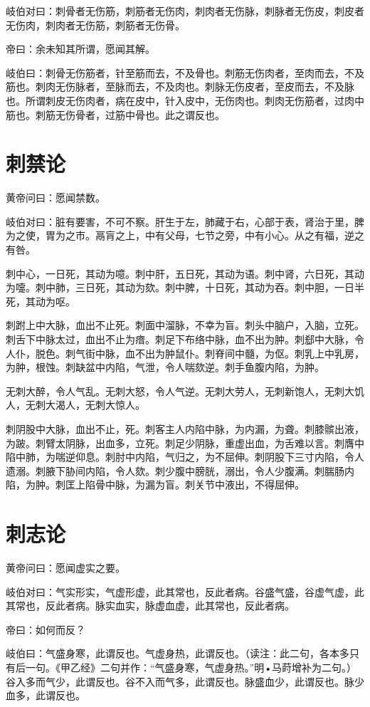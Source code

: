 \documentclass{article}%
\begin{document}
岐伯对曰：刺骨者无伤筋，刺筋者无伤肉，刺肉者无伤脉，刺脉者无伤皮，刺皮者无伤肉，刺肉者无伤筋，刺筋者无伤骨。

帝曰：余未知其所谓，愿闻其解。

岐伯曰：刺骨无伤筋者，针至筋而去，不及骨也。刺筋无伤肉者，至肉而去，不及筋也。刺肉无伤脉者，至脉而去，不及肉也。刺脉无伤皮者，至皮而去，不及脉也。所谓刺皮无伤肉者，病在皮中，针入皮中，无伤肉也。刺肉无伤筋者，过肉中筋也。刺筋无伤骨者，过筋中骨也。此之谓反也。
\section{刺禁论}
黄帝问曰：愿闻禁数。

岐伯对曰：脏有要害，不可不察。肝生于左，肺藏于右，心部于表，肾治于里，脾为之使，胃为之市。鬲肓之上，中有父母，七节之旁，中有小心。从之有福，逆之有咎。

刺中心，一日死，其动为噫。刺中肝，五日死，其动为语。刺中肾，六日死，其动为嚏。刺中肺，三日死，其动为欬。刺中脾，十日死，其动为吞。刺中胆，一日半死，其动为呕。

刺跗上中大脉，血出不止死。刺面中溜脉，不幸为盲。刺头中脑户，入脑，立死。刺舌下中脉太过，血出不止为瘖。刺足下布络中脉，血不出为肿。刺郄中大脉，令人仆，脱色。刺气街中脉，血不出为肿鼠仆。刺脊间中髓，为伛。刺乳上中乳房，为肿，根蚀。刺缺盆中内陷，气泄，令人喘欬逆。刺手鱼腹内陷，为肿。

无刺大醉，令人气乱。无刺大怒，令人气逆。无刺大劳人，无刺新饱人，无刺大饥人，无刺大渴人，无刺大惊人。

刺阴股中大脉，血出不止，死。刺客主人内陷中脉，为内漏，为聋。刺膝髌出液，为跛。刺臂太阴脉，出血多，立死。刺足少阴脉，重虚出血，为舌难以言。刺膺中陷中肺，为喘逆仰息。刺肘中内陷，气归之，为不屈伸。刺阴股下三寸内陷，令人遗溺。刺腋下胁间内陷，令人欬。刺少腹中膀胱，溺出，令人少腹满。刺腨肠内陷，为肿。刺匡上陷骨中脉，为漏为盲。刺关节中液出，不得屈伸。
\section{刺志论}
黄帝问曰：愿闻虚实之要。

岐伯对曰：气实形实，气虚形虚，此其常也，反此者病。谷盛气盛，谷虚气虚，此其常也，反此者病。脉实血实，脉虚血虚，此其常也，反此者病。

帝曰：如何而反？

岐伯曰：气盛身寒，此谓反也。气虚身热，此谓反也。（读注：此二句，各本多只有后一句。《甲乙经》二句并作：“气盛身寒，气虚身热。”明•马莳增补为二句。）谷入多而气少，此谓反也。谷不入而气多，此谓反也。脉盛血少，此谓反也。脉少血多，此谓反也。
\end{document}
